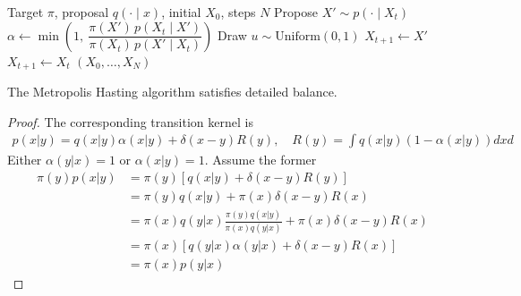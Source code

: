 \begin{algorithm}
\caption{Metropolis--Hastings}
\begin{algorithmic}[1]
\Require Target $\pi$, proposal $q(\cdot\mid x)$, initial $X_0$, steps $N$
    \State Propose $X' \sim p(\cdot \mid X_t)$
    \State $\alpha \gets \min\!\left(1,\ \dfrac{\pi(X')\,p(X_t \mid X')}{\pi(X_t)\,p(X' \mid X_t)}\right)$
    \State Draw $u \sim \mathrm{Uniform}(0,1)$
        \State $X_{t+1} \gets X'$ 
    \Else
        \State $X_{t+1} \gets X_t$ 
    \EndIf
\EndFor
\State \Return $(X_0, \dots, X_N)$
\end{algorithmic}
\end{algorithm}

\begin{fact}
	The Metropolis Hasting algorithm satisfies detailed balance.
\end{fact}
\begin{proof}
	The corresponding transition kernel is
	\begin{align}
		p(x|y) = q(x|y) \alpha(x|y) + \delta(x-y) R(y), \quad R(y) = \int q(x|y) (1- \alpha(x|y)) dxd
	\end{align}
	Either $\alpha(y |x) = 1$ or $\alpha(x|y) = 1$. Assume the former
	\begin{align}
		\pi(y)  p(x|y) & = \pi(y) [q(x|y) + \delta(x-y) R(y)]\\
		& = \pi(y) q(x|y) + \pi(x) \delta(x-y) R(x)\\
		& = \pi(x) q(y|x) \frac{\pi(y) q(x|y)}{\pi(x) q(y|x)} + \pi(x) \delta(x-y) R(x)\\
		& = \pi(x) [q(y|x) \alpha(y | x)  + \delta(x-y) R(x)]\\
		& = \pi(x) p(y|x)
	\end{align}
\end{proof}


